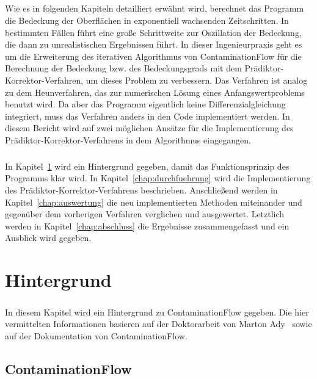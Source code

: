 \documentclass{listhesis}
\begin{document}
\paragraph{}
Wie es in folgenden Kapiteln detailliert erwähnt wird, berechnet das Programm die Bedeckung der Oberflächen in exponentiell wachsenden Zeitschritten. In bestimmten Fällen führt eine große Schrittweite zur Oszillation der Bedeckung, die dann zu unrealistischen Ergebnissen führt. In dieser Ingenieurpraxis geht es um die Erweiterung des iterativen Algorithmus von ContaminationFlow für die Berechnung der Bedeckung bzw. des Bedeckungsgrads mit dem Prädiktor-Korrektor-Verfahren, um dieses Problem zu verbessern. Das Verfahren ist analog zu dem Heunverfahren, das zur numerischen Lösung eines Anfangswertproblems benutzt wird. Da aber das Programm eigentlich keine Differenzialgleichung integriert, muss das Verfahren anders in den Code implementiert werden. In diesem Bericht wird auf zwei möglichen Ansätze für die Implementierung des Prädiktor-Korrektor-Verfahrens in dem Algorithmus eingegangen. 
\paragraph{}
In Kapitel~\ref{chap:hintergrund} wird ein Hintergrund gegeben, damit das Funktionsprinzip des Programms klar wird. In Kapitel~\ref{chap:durchfuehrung} wird die Implementierung des Prädiktor-Korrektor-Verfahrens beschrieben. Anschließend werden in Kapitel~\ref{chap:auswertung} die neu implementierten Methoden miteinander und gegenüber dem vorherigen Verfahren verglichen und ausgewertet. Letztlich werden in Kapitel~\ref{chap:abschluss} die Ergebnisse zusammengefasst und ein Ausblick wird gegeben.

\chapter{Hintergrund} \label{chap:hintergrund}
\paragraph{}
In diesem Kapitel wird ein Hintergrund zu ContaminationFlow gegeben. Die hier vermittelten Informationen basieren auf der Doktorarbeit von Marton Ady~\cite{marton} sowie auf der Dokumentation von ContaminationFlow.

\section{ContaminationFlow} \label{section:contaminationflow}
\end{document}
